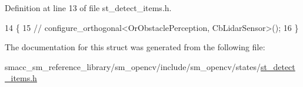 Definition at line 13 of file st\+\_\+detect\+\_\+items.\+h.


\begin{DoxyCode}
14         \{
15             \textcolor{comment}{//   configure\_orthogonal<OrObstaclePerception, CbLidarSensor>();}
16         \}
\end{DoxyCode}


The documentation for this struct was generated from the following file\+:\begin{DoxyCompactItemize}
\item 
smacc\+\_\+sm\+\_\+reference\+\_\+library/sm\+\_\+opencv/include/sm\+\_\+opencv/states/\hyperlink{st__detect__items_8h}{st\+\_\+detect\+\_\+items.\+h}\end{DoxyCompactItemize}
